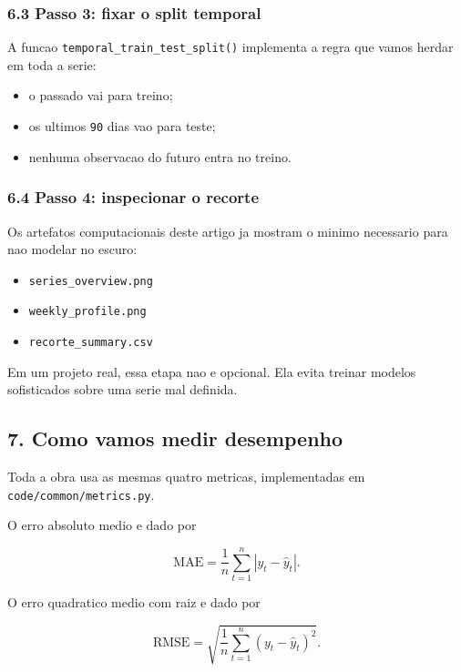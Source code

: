 \documentclass[12pt]{article}
\providecommand{\tightlist}{%
          \setlength{\itemsep}{0pt}\setlength{\parskip}{0pt}}
\begin{document}
\subsubsection{6.3 Passo 3: fixar o split temporal}\label{63-passo-3-fixar-o-split-temporal}

A funcao \texttt{temporal\_train\_test\_split()} implementa a regra que vamos herdar em toda a serie:

\begin{itemize}
\tightlist
\item
  o passado vai para treino;
\item
  os ultimos \texttt{90} dias vao para teste;
\item
  nenhuma observacao do futuro entra no treino.
\end{itemize}

\subsubsection{6.4 Passo 4: inspecionar o recorte}\label{64-passo-4-inspecionar-o-recorte}

Os artefatos computacionais deste artigo ja mostram o minimo necessario para nao modelar no escuro:

\begin{itemize}
\tightlist
\item
  \texttt{series\_overview.png}
\item
  \texttt{weekly\_profile.png}
\item
  \texttt{recorte\_summary.csv}
\end{itemize}

Em um projeto real, essa etapa nao e opcional. Ela evita treinar modelos sofisticados sobre uma serie mal definida.

\subsection{7. Como vamos medir desempenho}\label{7-como-vamos-medir-desempenho}

Toda a obra usa as mesmas quatro metricas, implementadas em \texttt{code/common/metrics.py}.

O erro absoluto medio e dado por

\[
\mathrm{MAE} = \frac{1}{n} \sum_{t=1}^n |y_t - \hat{y}_t|.
\]

O erro quadratico medio com raiz e dado por

\[
\mathrm{RMSE} = \sqrt{\frac{1}{n} \sum_{t=1}^n (y_t - \hat{y}_t)^2}.
\]
\end{document}
